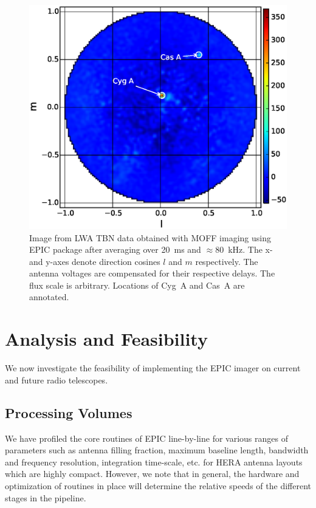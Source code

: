 \documentclass[a4paper,fleqn,usenatbib]{mnras}
\begin{document}
\begin{figure}
  \includegraphics[width=\columnwidth]{figure9}
  \caption{Image from LWA TBN data obtained with MOFF imaging using EPIC 
    package after averaging over 20~ms and $\approx 80$~kHz. The x- and y-axes
    denote direction cosines $l$ and $m$ respectively. The antenna voltages
    are compensated for their respective delays. The flux scale is arbitrary.
    Locations of Cyg~A and Cas~A are annotated.}
  \label{fig:LWA-image}
\end{figure}

\section{Analysis and Feasibility}\label{sec:analysis}

We now investigate the feasibility of implementing the EPIC imager on current
and future radio telescopes. 

\subsection{Processing Volumes}

We have profiled the core routines of EPIC line-by-line for various ranges of 
parameters such as antenna filling fraction, maximum baseline length, bandwidth 
and frequency resolution, integration time-scale, etc. for HERA antenna layouts 
which are highly compact. However, we note that in general, the hardware and 
optimization of routines in place will determine the relative speeds of the 
different stages in the pipeline. 
\end{document}
